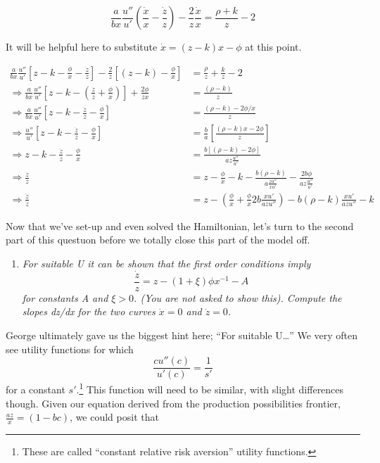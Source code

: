 \documentclass[
]{article}
\providecommand{\tightlist}{%
  \setlength{\itemsep}{0pt}\setlength{\parskip}{0pt}}
\begin{document}
\[\frac{a}{bx}\frac{u''}{u'}\left(\frac{\dot{x}}{x} - \frac{\dot{z}}{z}\right) - \frac{2}{z}\frac{\dot{x}}{x} = \frac{\rho + k}{z} - 2\]

It will be helpful here to substitute \(\dot{x} = (z-k)x - \phi\) at
this point.

\begin{align}

\frac{a}{bx}\frac{u''}{u'}\left[z - k - \frac{\phi}{x} - \frac{\dot{z}}{z}\right] - \frac{2}{z}\left[(z-k) - \frac{\phi}{x}\right] &= \frac{\rho}{z} + \frac{k}{z} - 2 \\
\Rightarrow \frac{a}{bx}\frac{u''}{u'}\left[ z - k - \left( \frac{\dot{z}}{z} + \frac{\phi}{x}\right) \right] + \frac{2 \phi}{zx} &= \frac{(\rho - k)}{z} \\
\Rightarrow \frac{a}{bx}\frac{u''}{u'}\left[ z - k - \frac{\dot{z}}{z} - \frac{\phi}{x} \right] &= \frac{(\rho - k) - 2\phi/x}{z} \\
\Rightarrow \frac{u''}{u'}\left[ z - k - \frac{\dot{z}}{z} - \frac{\phi}{x} \right] &= \frac{b}{a}\left[\frac{(\rho - k)x - 2\phi}{z}\right] \\
\Rightarrow z - k - \frac{\dot{z}}{z} - \frac{\phi}{x} &= \frac{b[(\rho - k ) - 2\phi]}{az\frac{u''}{u'}} \\
\Rightarrow \frac{\dot{z}}{z} &= z - \frac{\phi}{x} - k - \frac{b(\rho - k)}{a\frac{zu''}{xu'}} - \frac{2b\phi}{az\frac{u''}{u'}} \\
\Rightarrow \frac{\dot{z}}{z} &= z - \left( \frac{\phi}{x} + \frac{\phi}{x}2b\frac{xu'}{azu''} \right)- b(\rho - k)\frac{xu'}{azu''} - k

\end{align}

Now that we've set-up and even solved the Hamiltonian, let's turn to the
second part of this questuon before we totally close this part of the
model off.

\begin{enumerate}
\def\labelenumi{\arabic{enumi}.}
\setcounter{enumi}{1}
\tightlist
\item
  \emph{For suitable U it can be shown that the first order conditions
  imply} \[\frac{\dot{z}}{z} = z - (1+\xi)\phi x^{-1} - A\] \emph{for
  constants A and \(\xi>0\). (You are not asked to show this). Compute
  the slopes dz/dx for the two curves \(\dot{x} = 0\) and
  \(\dot{z} = 0\).}
\end{enumerate}

George ultimately gave us the biggest hint here; ``For suitable
U\ldots{}'' We very often see utility functions for which
\[\frac{cu''(c)}{u'(c)} = \frac{1}{s'}\] for a constant
\(s'\).\footnote{These are called ``constant relative risk aversion''
  utility functions.} This function will need to be similar, with slight
differences though. Given our equation derived from the production
possibilities frontier, \(\frac{az}{x} = (1-bc)\), we could posit that
\end{document}
